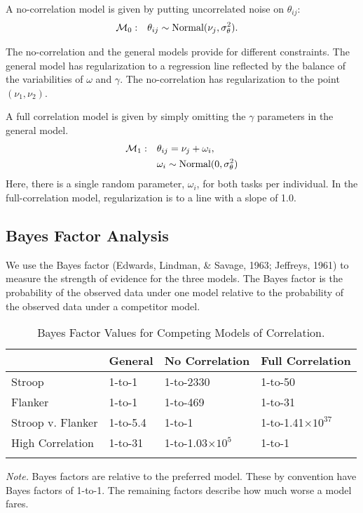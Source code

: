 \documentclass[english,man]{apa6}
\theoremstyle{definition}
\theoremstyle{definition}
\theoremstyle{definition}
\theoremstyle{remark}
\begin{document}
A no-correlation model is given by putting uncorrelated noise on
\(\theta_{ij}\): \[
\begin{aligned}
{\cal M}_0: \quad & \theta_{ij} \sim \mbox{Normal}(\nu_j,\sigma^2_\theta).
\end{aligned}\]

The no-correlation and the general models provide for different
constraints. The general model has regularization to a regression line
reflected by the balance of the variabilities of \(\omega\) and
\(\gamma\). The no-correlation has regularization to the point
\((\nu_1,\nu_2)\).

A full correlation model is given by simply omitting the \(\gamma\)
parameters in the general model. \[
\begin{aligned}
{\cal M}_1: \quad & \theta_{ij}=\nu_j+\omega_i,\\
& \omega_i \sim \mbox{Normal}(0,\sigma^2_\theta)
\end{aligned}
\] Here, there is a single random parameter, \(\omega_i\), for both
tasks per individual. In the full-correlation model, regularization is
to a line with a slope of 1.0.

\subsection{Bayes Factor Analysis}\label{bayes-factor-analysis}

We use the Bayes factor (Edwards, Lindman, \& Savage, 1963; Jeffreys,
1961) to measure the strength of evidence for the three models. The
Bayes factor is the probability of the observed data under one model
relative to the probability of the observed data under a competitor
model.

\begin{table}[tbp]
\begin{center}
\begin{threeparttable}
\caption{\label{tab:bftab}Bayes Factor Values for Competing Models of Correlation.}
\begin{tabular}{llll}
\toprule
 & \multicolumn{1}{c}{General} & \multicolumn{1}{c}{No Correlation} & \multicolumn{1}{c}{Full Correlation}\\
\midrule
Stroop & 1-to-1 & 1-to-2330 & 1-to-50\\
Flanker & 1-to-1 & 1-to-469 & 1-to-31\\
Stroop v. Flanker & 1-to-5.4 & 1-to-1 & 1-to-1.41$\times 10^{37}$\\
High Correlation & 1-to-31 & 1-to-1.03$\times 10^{5}$ & 1-to-1\\
\bottomrule
\addlinespace
\end{tabular}
\begin{tablenotes}[para]
\textit{Note.} Bayes factors are relative to the preferred model.  These by convention have Bayes factors of 1-to-1.  The remaining factors describe how much worse a model fares.
\end{tablenotes}
\end{threeparttable}
\end{center}
\end{table}
\end{document}
